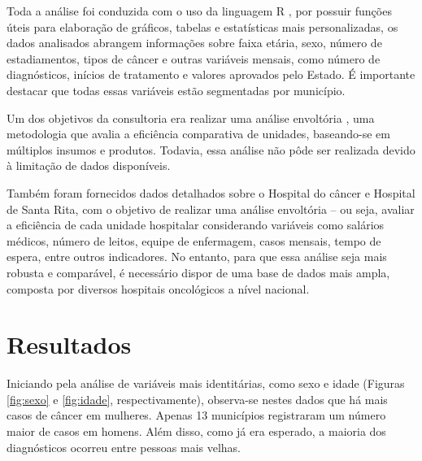 \documentclass[a4paper]{modeloLEA} %
\begin{document}
Toda a análise foi conduzida com o uso da linguagem R \cite{R2017}, por possuir funções úteis para elaboração de gráficos, tabelas e estatísticas mais personalizadas, os dados analisados abrangem informações sobre faixa etária, sexo, número de estadiamentos, tipos de câncer e outras variáveis mensais, como número de diagnósticos, inícios de tratamento e valores aprovados pelo Estado. É importante destacar que todas essas variáveis estão segmentadas por município.

Um dos objetivos da consultoria era realizar uma análise envoltória \cite{livro}, uma metodologia que avalia a eficiência comparativa de unidades, baseando-se em múltiplos insumos e produtos. Todavia, essa análise não pôde ser realizada devido à limitação de dados disponíveis.

Também foram fornecidos dados detalhados sobre o Hospital do câncer e Hospital de Santa Rita, com o objetivo de realizar uma análise envoltória -- ou seja, avaliar a eficiência de cada unidade hospitalar considerando variáveis como salários médicos, número de leitos, equipe de enfermagem, casos mensais, tempo de espera, entre outros indicadores. No entanto, para que essa análise seja mais robusta e comparável, é necessário dispor de uma base de dados mais ampla, composta por diversos hospitais oncológicos a nível nacional.

\section{Resultados}\label{resultados}

Iniciando pela análise de variáveis mais identitárias, como sexo e idade (Figuras \ref{fig:sexo} e \ref{fig:idade}, respectivamente), observa-se nestes dados que há mais casos de câncer em mulheres. Apenas 13 municípios registraram um número maior de casos em homens. Além disso, como já era esperado, a maioria dos diagnósticos ocorreu entre pessoas mais velhas.
\end{document}
